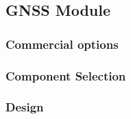 \subsection{GNSS Module}
\subsubsection{Commercial options}
\subsubsection{Component Selection}
\subsubsection{Design}